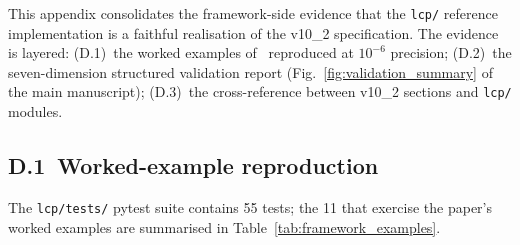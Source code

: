 
This appendix consolidates the framework-side evidence that the \texttt{lcp/} reference implementation is a faithful realisation of the v10\_2 specification. The evidence is layered: (D.1)~the worked examples of~\cite[\S11]{lcp2025} reproduced at $10^{-6}$ precision; (D.2)~the seven-dimension structured validation report (Fig.~\ref{fig:validation_summary} of the main manuscript); (D.3)~the cross-reference between v10\_2 sections and \texttt{lcp/} modules.

\subsection*{D.1\ Worked-example reproduction}

The \texttt{lcp/tests/} pytest suite contains 55 tests; the 11 that exercise the paper's worked examples are summarised in Table~\ref{tab:framework_examples}.

